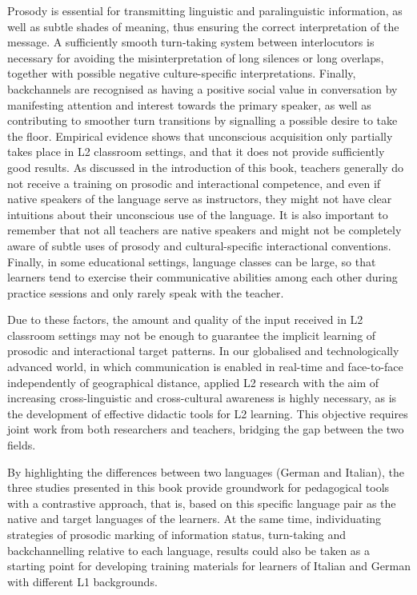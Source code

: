 Prosody is essential for transmitting linguistic and paralinguistic information, as well as subtle shades of meaning, thus ensuring the correct interpretation of the message. A sufficiently smooth turn-taking system between interlocutors is necessary for avoiding the misinterpretation of long silences or long overlaps, together with possible negative culture-specific interpretations. Finally, backchannels are recognised as having a positive social value in conversation by manifesting attention and interest towards the primary speaker, as well as contributing to smoother turn transitions by signalling a possible desire to take the floor. Empirical evidence shows that unconscious acquisition only partially takes place in L2 classroom settings, and that it does not provide sufficiently good results. As discussed in the introduction of this book, teachers generally do not receive a training on prosodic and interactional competence, and even if native speakers of the language serve as instructors, they might not have clear intuitions about their unconscious use of the language. It is also important to remember that not all teachers are native speakers and might not be completely aware of subtle uses of prosody and cultural-specific interactional conventions. Finally, in some educational settings, language classes can be large, so that learners tend to exercise their communicative abilities among each other during practice sessions and only rarely speak with the teacher.

Due to these factors, the amount and quality of the input received in L2 classroom settings may not be enough to guarantee the implicit learning of prosodic and interactional target patterns. In our globalised and technologically advanced world, in which communication is enabled in real-time and face-to-face independently of geographical distance, applied L2 research with the aim of increasing cross-linguistic and cross-cultural awareness is highly necessary, as is the development of effective didactic tools for L2 learning. This objective requires joint work from both researchers and teachers, bridging the gap between the two fields.

By highlighting the differences between two languages (German and Italian), the three studies presented in this book provide groundwork for pedagogical tools with a contrastive approach, that is, based on this specific language pair as the native and target languages of the learners. At the same time, individuating strategies of prosodic marking of information status, turn-taking and backchannelling relative to each language, results could also be taken as a starting point for developing training materials for learners of Italian and German with different L1 backgrounds.

